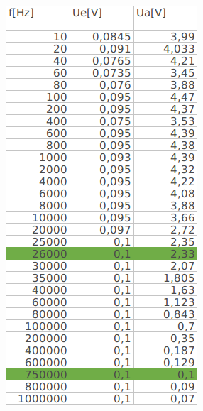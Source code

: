 \documentclass[12pt,a4paper,titlepage]{article}
\begin{document}
\begin{figure}[H]
  \centering
  \begin{minipage}[b]{0.4\textwidth}
    \includegraphics[width=\textwidth]{daten_47.png}

\end{minipage}
\end{figure}
\end{document}
